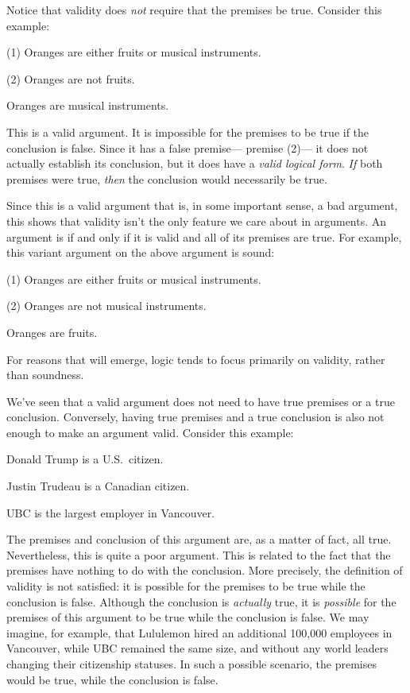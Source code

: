 Notice that validity does \emph{not} require that the premises be true. Consider this example:

\begin{earg}
\item[(1)] Oranges are either fruits or musical instruments.
\item[(2)] Oranges are not fruits.
\item[\therefore] Oranges are musical instruments.
\end{earg}

This is a valid argument. It is impossible for the premises to be true if the conclusion is false. Since it has a false premise--- premise (2)--- it does not actually establish its conclusion, but it does have a \emph{valid logical form}. \emph{If} both premises were true, \emph{then} the conclusion would necessarily be true.

Since this is a valid argument that is, in some important sense, a bad argument, this shows that validity isn't the only feature we care about in arguments. An argument is  if and only if it is valid and all of its premises are true. For example, this variant argument on the above argument is sound:

\begin{earg}
\item[(1)] Oranges are either fruits or musical instruments.
\item[(2)] Oranges are not musical instruments.
\item[\therefore] Oranges are fruits.
\end{earg}

 For reasons that will emerge, logic tends to focus primarily on validity, rather than soundness.

We've seen that a valid argument does not need to have true premises or a true conclusion. Conversely, having true premises and a true conclusion is also not enough to make an argument valid. Consider this example:

\begin{earg}
\item[] Donald Trump is a U.S.\ citizen.
\item[] Justin Trudeau is a Canadian citizen.
\item[\therefore] UBC is the largest employer in Vancouver.
\end{earg}

The premises and conclusion of this argument are, as a matter of fact, all true. Nevertheless, this is quite a poor argument. This is related to the fact that the premises have nothing to do with the conclusion. More precisely, the definition of validity is not satisfied: it is possible for the premises to be true while the conclusion is false. Although the conclusion is \emph{actually} true, it is \emph{possible} for the premises of this argument to be true while the conclusion is false. We may imagine, for example, that Lululemon hired an additional 100,000 employees in Vancouver, while UBC remained the same size, and without any world leaders changing their citizenship statuses. In such a possible scenario, the premises would be true, while the conclusion is false.


